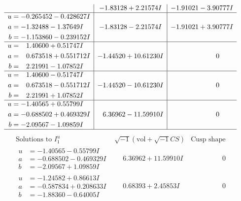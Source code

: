\documentclass[1p]{elsarticle_modified}
\theoremstyle{definition}
\newcommand{\I}{\sqrt{-1}}
\begin{document}
$$\begin{array}{c|c|c}
 & -1.83128 + 2.21574 I & -1.91021 - 3.90777 I \\ \hline\begin{aligned}
u &= -0.265452 - 0.428627 I \\
a &= -1.32488 - 1.37649 I \\
b &= -1.153860 - 0.239152 I\end{aligned}
 & -1.83128 - 2.21574 I & -1.91021 + 3.90777 I \\ \hline\begin{aligned}
u &= \phantom{-}1.40600 + 0.51747 I \\
a &= \phantom{-}0.673518 + 0.551712 I \\
b &= \phantom{-}2.21991 - 1.07852 I\end{aligned}
 & -1.44520 + 10.61230 I & \phantom{-0.000000 } 0 \\ \hline\begin{aligned}
u &= \phantom{-}1.40600 - 0.51747 I \\
a &= \phantom{-}0.673518 - 0.551712 I \\
b &= \phantom{-}2.21991 + 1.07852 I\end{aligned}
 & -1.44520 - 10.61230 I & \phantom{-0.000000 } 0 \\ \hline\begin{aligned}
u &= -1.40565 + 0.55799 I \\
a &= -0.688502 + 0.469329 I \\
b &= -2.09567 - 1.09859 I\end{aligned}
 & \phantom{-}6.36962 - 11.59910 I & \phantom{-0.000000 } 0\\
 \hline 
 \end{array}$$\newpage$$\begin{array}{c|c|c}  
\text{Solutions to }I^u_{1}& \I (\text{vol} + \sqrt{-1}CS) & \text{Cusp shape}\\
 \hline 
\begin{aligned}
u &= -1.40565 - 0.55799 I \\
a &= -0.688502 - 0.469329 I \\
b &= -2.09567 + 1.09859 I\end{aligned}
 & \phantom{-}6.36962 + 11.59910 I & \phantom{-0.000000 } 0 \\ \hline\begin{aligned}
u &= -1.24582 + 0.86613 I \\
a &= -0.587834 + 0.208633 I \\
b &= -1.88360 - 0.64005 I\end{aligned}
 & \phantom{-}0.68393 + 2.45853 I & \phantom{-0.000000 } 0 \\ \hline\begin{aligned}

\end{aligned}
\end{array}$$
\end{document}
